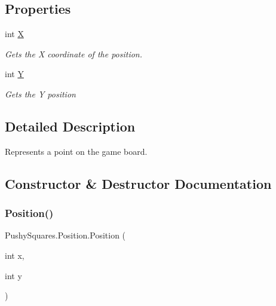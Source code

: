 \subsection*{Properties}
\begin{DoxyCompactItemize}
\item 
int \hyperlink{struct_pushy_squares_1_1_position_a35115084c01a6abc427fcebe771d6a87}{X}
\begin{DoxyCompactList}\small\item\em Gets the X coordinate of the position. \end{DoxyCompactList}\item 
int \hyperlink{struct_pushy_squares_1_1_position_a976a349430fe3bdf57db6eb77f9b0b84}{Y}
\begin{DoxyCompactList}\small\item\em Gets the Y position \end{DoxyCompactList}\end{DoxyCompactItemize}


\subsection{Detailed Description}
Represents a point on the game board. 



\subsection{Constructor \& Destructor Documentation}
\mbox{\label{struct_pushy_squares_1_1_position_ad1f9a5ef218574d0e49635a8e7a23860}} 
\subsubsection{\texorpdfstring{Position()}{Position()}}
{\footnotesize\ttfamily Pushy\+Squares.\+Position.\+Position (\begin{DoxyParamCaption}\item[{int}]{x,  }\item[{int}]{y }\end{DoxyParamCaption})}



